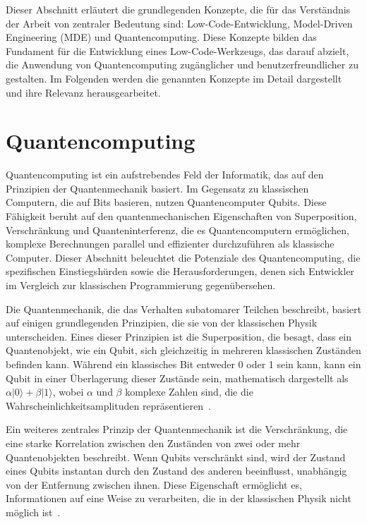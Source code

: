 Dieser Abschnitt erläutert die grundlegenden Konzepte, die für das Verständnis der Arbeit von zentraler Bedeutung sind: 
Low-Code-Entwicklung, Model-Driven Engineering (MDE) und Quantencomputing. Diese Konzepte bilden das Fundament für die 
Entwicklung eines Low-Code-Werkzeugs, das darauf abzielt, die Anwendung von Quantencomputing zugänglicher und 
benutzerfreundlicher zu gestalten. Im Folgenden werden die genannten Konzepte im Detail dargestellt und ihre Relevanz herausgearbeitet.


\section{Quantencomputing}
Quantencomputing ist ein aufstrebendes Feld der Informatik, das auf den Prinzipien der Quantenmechanik basiert. 
Im Gegensatz zu klassischen Computern, die auf Bits basieren, nutzen Quantencomputer Qubits. 
Diese Fähigkeit beruht auf den quantenmechanischen 
Eigenschaften von Superposition, Verschränkung und Quanteninterferenz, die es Quantencomputern ermöglichen, 
komplexe Berechnungen parallel und effizienter durchzuführen als klassische Computer. Dieser Abschnitt beleuchtet 
die Potenziale des Quantencomputing, die spezifischen Einstiegshürden sowie die 
Herausforderungen, denen sich Entwickler im Vergleich zur klassischen Programmierung gegenübersehen. 

Die Quantenmechanik, die das Verhalten subatomarer Teilchen beschreibt, basiert auf einigen grundlegenden Prinzipien, 
die sie von der klassischen Physik unterscheiden. Eines dieser Prinzipien ist die Superposition, die besagt, dass ein 
Quantenobjekt, wie ein Qubit, sich gleichzeitig in mehreren klassischen Zuständen befinden kann. Während ein klassisches Bit 
entweder 0 oder 1 sein kann, kann ein Qubit in einer Überlagerung dieser Zustände sein, mathematisch dargestellt 
als \( \alpha|0\rangle + \beta|1\rangle \), wobei \( \alpha \) und \( \beta \) komplexe Zahlen sind, die die 
Wahrscheinlichkeitsamplituden repräsentieren~\cite{nielsen2010quantum}.

Ein weiteres zentrales Prinzip der Quantenmechanik ist die Verschränkung, die eine starke Korrelation zwischen den 
Zuständen von zwei oder mehr Quantenobjekten beschreibt. Wenn Qubits verschränkt sind, wird der Zustand eines Qubits 
instantan durch den Zustand des anderen beeinflusst, unabhängig von der Entfernung zwischen ihnen. Diese Eigenschaft 
ermöglicht es, Informationen auf eine Weise zu verarbeiten, die in der klassischen Physik nicht möglich ist~\cite{einstein1935can}.

